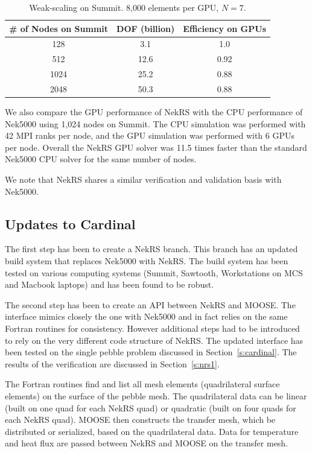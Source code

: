 \begin{table} [!b]
\begin{center} \begin{tabular}{ccc}
\toprule
\# of Nodes on Summit & DOF (billion) &  Efficiency on GPUs \\
\midrule
 128  & 3.1  & 1.0   \\
 512  & 12.6 & 0.92  \\
 1024 & 25.2 & 0.88  \\
 2048 & 50.3 & 0.88 \\
\bottomrule \end{tabular} \end{center}
\caption{\label{wscaling} Weak-scaling on Summit. 8,000 elements per GPU, $N=7$.}
\end{table}

We also compare the GPU performance of NekRS with the CPU performance of Nek5000 using 1,024 nodes on Summit. The CPU simulation was performed with 42 MPI ranks per node, and the GPU simulation was performed with 6 GPUs  per node. Overall the NekRS GPU solver was 11.5 times faster than the standard Nek5000 CPU solver for the same number of nodes.

We note that NekRS shares a similar verification and validation basis with Nek5000.

\subsection{Updates to Cardinal}

The first step has been to create a NekRS branch. This branch has an updated build system that replaces Nek5000 with NekRS. The build system has been tested on various computing systems (Summit, Sawtooth, Workstations on MCS and Macbook laptops) and has been found to be robust.

The second step has been to create an API between NekRS and MOOSE. The interface mimics closely the one with Nek5000 and in fact relies on the same Fortran routines for consistency. However additional steps had to be introduced to rely on the very different code structure of NekRS. The updated interface has been tested on the single pebble problem discussed in Section~\ref{s:cardinal}. The results of the verification are discussed in Section~\ref{s:nrs1}.

The Fortran routines find and list all mesh elements (quadrilateral surface elements) on the surface of the pebble mesh. The quadrilateral data can be linear (built on one quad for each NekRS quad) or quadratic (built on four quads for each NekRS quad). MOOSE then constructs the transfer mesh, which be distributed or serialized, based on the quadrilateral data. Data for temperature and heat flux are passed between NekRS and MOOSE on the transfer mesh.

